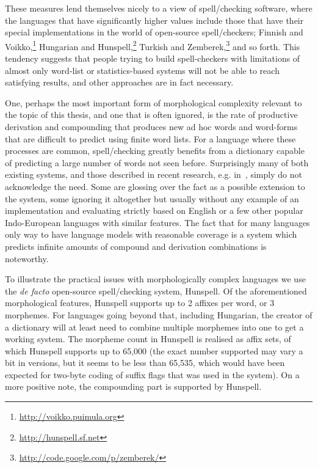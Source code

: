 \documentclass[officiallayout]{unihelcompling}
\begin{document}
These measures lend themselves nicely to a view of spell\-/checking
software, where the languages that have significantly higher values 
include those that have their special implementations in the
world of open-source spell\-/checkers; Finnish and
Voikko,\footnote{\url{http://voikko.puimula.org}} Hungarian and
Hunspell,\footnote{\url{http://hunspell.sf.net}} Turkish and
Zemberek,\footnote{\url{http://code.google.com/p/zemberek/}} and so forth.
This tendency suggests that people trying to build spell-checkers with
limitations of almost only word-list or statistics-based systems will not be
able to reach satisfying results, and other approaches are in fact necessary.

One, perhaps the most important form of morphological complexity relevant to
the topic of this thesis, and one that is often ignored, is the rate of
productive derivation and compounding that produces new ad hoc words and
word-forms that are difficult to predict using finite word lists.  For a
language where these processes are common, spell\-/checking greatly benefits
from a dictionary capable of predicting a large number of words not seen
before. Surprisingly many of both existing systems, and those described in
recent research, e.g.  in~\cite{hassan2008language,watson2003new}, simply do
not acknowledge the need.  Some are glossing over the fact as a possible
extension to the system, some ignoring it altogether but usually without any
example of an implementation and evaluating strictly based on English or a few
other popular Indo-European languages with similar features. The fact that for
many languages only way to have language models with reasonable coverage is a
system which predicts infinite amounts of compound and derivation combinations
is noteworthy.

To illustrate the practical issues with morphologically complex languages we
use the \emph{de facto} open-source spell\-/checking system, Hunspell. Of the
aforementioned morphological features, Hunspell supports up to 2 affixes per
word, or 3 morphemes. For languages going beyond that, including Hungarian, the
creator of a dictionary will at least need to combine multiple morphemes into
one to get a working system. The morpheme count in Hunspell is realised as
affix sets, of which Hunspell supports up to 65,000 (the exact number supported
may vary a bit in versions, but it seems to be less than 65,535, which
would have been expected for two-byte coding of suffix flags that was
used in the system). On a more
positive note, the compounding part is supported by Hunspell.
\end{document}
